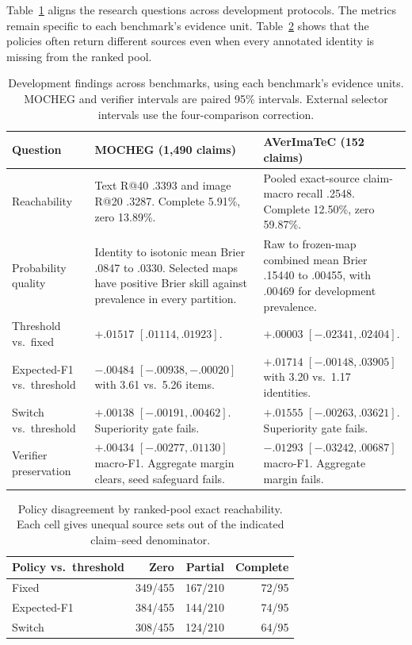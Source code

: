 Table~\ref{tab:cross-benchmark} aligns the research questions across development protocols. The metrics remain specific to each benchmark's evidence unit. Table~\ref{tab:external-disagreement} shows that the policies often return different sources even when every annotated identity is missing from the ranked pool.

\begin{table}[t]
\centering
\caption{Development findings across benchmarks, using each benchmark's evidence units. MOCHEG and verifier intervals are paired 95\% intervals. External selector intervals use the four-comparison correction.}
\label{tab:cross-benchmark}
\small
\begin{tabular}{@{}>{\raggedright\arraybackslash}p{}*{2}{>{\raggedright\arraybackslash}p{}}@{}}
\toprule
Question & MOCHEG (1,490 claims) & AVerImaTeC (152 claims) \\
\midrule
Reachability & Text R@40 .3393 and image R@20 .3287. Complete 5.91\%, zero 13.89\%. & Pooled exact-source claim-macro recall .2548. Complete 12.50\%, zero 59.87\%. \\
Probability quality & Identity to isotonic mean Brier .0847 to .0330. Selected maps have positive Brier skill against prevalence in every partition. & Raw to frozen-map combined mean Brier .15440 to .00455, with .00469 for development prevalence. \\
Threshold vs.\ fixed & $+.01517$ $[.01114,.01923]$. & $+.00003$ $[-.02341,.02404]$. \\
Expected-F1 vs.\ threshold & $-.00484$ $[-.00938,-.00020]$ with 3.61 vs.\ 5.26 items. & $+.01714$ $[-.00148,.03905]$ with 3.20 vs.\ 1.17 identities. \\
Switch vs.\ threshold & $+.00138$ $[-.00191,.00462]$. Superiority gate fails. & $+.01555$ $[-.00263,.03621]$. Superiority gate fails. \\
Verifier preservation & $+.00434$ $[-.00277,.01130]$ macro-F1. Aggregate margin clears, seed safeguard fails. & $-.01293$ $[-.03242,.00687]$ macro-F1. Aggregate margin fails. \\
\bottomrule
\end{tabular}
\end{table}

\begin{table}[t]
\centering
\caption{Policy disagreement by ranked-pool exact reachability. Each cell gives unequal source sets out of the indicated claim--seed denominator.}
\label{tab:external-disagreement}
\small
\setlength{\tabcolsep}{3pt}
\begin{tabular}{@{}lrrr@{}}
\toprule
Policy vs.\ threshold & Zero & Partial & Complete \\
\midrule
Fixed & 349/455 & 167/210 & 72/95 \\
Expected-F1 & 384/455 & 144/210 & 74/95 \\
Switch & 308/455 & 124/210 & 64/95 \\
\bottomrule
\end{tabular}
\end{table}

